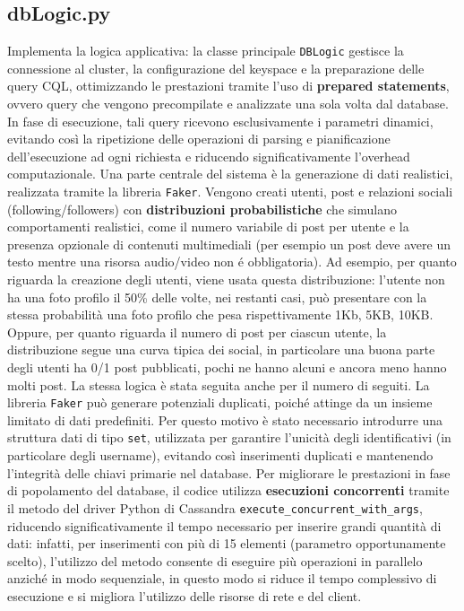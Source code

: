 \documentclass[12pt]{article}
\begin{document}
\subsection{dbLogic.py} \label{s_dbLogic}
Implementa la logica applicativa: la classe principale \texttt{DBLogic} gestisce la connessione al cluster, la configurazione del keyspace e la preparazione delle query CQL, ottimizzando le prestazioni tramite l’uso di \textbf{prepared statements}, ovvero query che vengono precompilate e analizzate una sola volta dal database. In fase di esecuzione, tali query ricevono esclusivamente i parametri dinamici, evitando così la ripetizione delle operazioni di parsing e pianificazione dell’esecuzione ad ogni richiesta e riducendo significativamente l’overhead computazionale.\newline\newline
\noindent
Una parte centrale del sistema è la generazione di dati realistici, realizzata tramite la libreria \texttt{Faker}. Vengono creati utenti, post e relazioni sociali (following/followers) con \textbf{distribuzioni probabilistiche} che simulano comportamenti realistici, come il numero variabile di post per utente e la presenza opzionale di contenuti multimediali (per esempio un post deve avere un testo mentre una risorsa audio/video non é obbligatoria). Ad esempio, per quanto riguarda la creazione degli utenti, 
viene usata questa distribuzione: l'utente non ha una foto profilo il 50\% delle volte, nei restanti casi, può presentare con la stessa probabilità una foto profilo che pesa rispettivamente 1Kb, 5KB, 10KB. Oppure, per quanto riguarda il numero di post per ciascun utente, la distribuzione 
segue una curva tipica dei social, in particolare una buona parte degli utenti ha 0/1 post pubblicati, pochi ne hanno alcuni e ancora meno hanno molti post. La stessa logica è stata seguita anche per il numero di seguiti.\newline
La libreria \texttt{Faker} può generare potenziali duplicati, poiché attinge da un insieme limitato di dati predefiniti. Per questo motivo è stato necessario introdurre una struttura dati di tipo \texttt{set}, utilizzata per garantire l’unicità degli identificativi (in particolare degli username), evitando così inserimenti duplicati e mantenendo l’integrità delle chiavi primarie nel database.\newline\newline
\noindent
Per migliorare le prestazioni in fase di popolamento del database, il codice utilizza \textbf{esecuzioni concorrenti} tramite il metodo del driver Python di Cassandra \newline \texttt{execute\_concurrent\_with\_args}, riducendo significativamente il tempo necessario per inserire grandi quantità di dati: infatti, per inserimenti con più di 15 elementi (parametro opportunamente scelto), l'utilizzo del metodo consente di eseguire più operazioni in parallelo anziché in modo sequenziale, in questo modo si riduce il tempo complessivo di esecuzione e si migliora l'utilizzo delle risorse di rete e del client.\newline\newline
\end{document}
